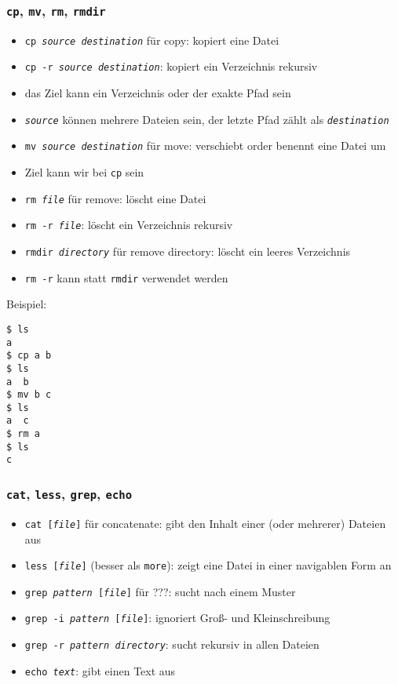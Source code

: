 \documentclass{article}
\begin{document}
      \subsubsection{\texttt{cp}, \texttt{mv}, \texttt{rm}, \texttt{rmdir}}
        \begin{itemize}
          \item \texttt{cp \textit{source} \textit{destination}} für copy: kopiert eine Datei
          \item \texttt{cp -r \textit{source} \textit{destination}}: kopiert ein Verzeichnis rekursiv
          \item das Ziel kann ein Verzeichnis oder der exakte Pfad sein
          \item \texttt{\textit{source}} können mehrere Dateien sein, der letzte Pfad zählt als \texttt{\textit{destination}}
          \item \texttt{mv \textit{source} \textit{destination}} für move: verschiebt order benennt eine Datei um
          \item Ziel kann wir bei \texttt{cp} sein
          \item \texttt{rm \textit{file}} für remove: löscht eine Datei
          \item \texttt{rm -r \textit{file}}: löscht ein Verzeichnis rekursiv
          \item \texttt{rmdir \textit{directory}} für remove directory: löscht ein leeres Verzeichnis
          \item \texttt{rm -r} kann statt \texttt{rmdir} verwendet werden
        \end{itemize}
        Beispiel:
\begin{verbatim}
$ ls
a
$ cp a b
$ ls
a  b
$ mv b c
$ ls
a  c
$ rm a
$ ls
c
\end{verbatim}

      \subsubsection{\texttt{cat}, \texttt{less}, \texttt{grep}, \texttt{echo}}
        \begin{itemize}
          \item \texttt{cat [\textit{file}]} für concatenate: gibt den Inhalt einer (oder mehrerer) Dateien aus
          \item \texttt{less [\textit{file}]} (besser als \texttt{more}): zeigt eine Datei in einer navigablen Form an
          \item \texttt{grep \textit{pattern} [\textit{file}]} für ???: sucht nach einem Muster
          \item \texttt{grep -i \textit{pattern} [\textit{file}]}: ignoriert Groß- und Kleinschreibung
          \item \texttt{grep -r \textit{pattern} \textit{directory}}: sucht rekursiv in allen Dateien
          \item \texttt{echo \textit{text}}: gibt einen Text aus
        \end{itemize}
\end{document}
